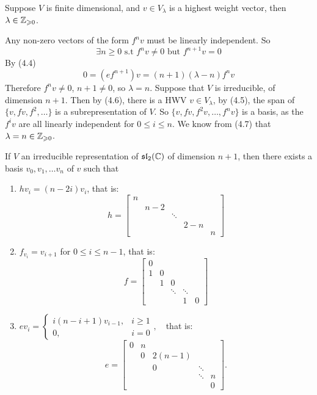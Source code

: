 \documentclass{article}
\begin{document}
\begin{fancylem}{} Suppose $V$ is finite dimensional, and $v \in V_{\lambda}$ is a highest weight vector, then $\lambda \in \mathbb{Z}_{\geqslant0}$.
\end{fancylem}
\proof Any non-zero vectors of the form $f^{n}v$ must be linearly independent. So \[ \exists n\geq 0 \text{  s.t  } f^{n}v \neq 0 \text{  but  } f^{n+1}v=0\]
By ($4.4$) \[ 0 = (ef^{n+1})v = (n+1)(\lambda - n)f^{n}v \]
Therefore $f^{n}v \neq 0$, $n+1 \neq0$, so $\lambda=n$. \endproof Suppose that $V$ is irreducible, of dimension $n+1$. Then by (4.6), there is a HWV $v \in V_{\lambda}$, by (4.5), the span of $\{ v,fv,f^{2},\dots\}$ is a subrepresentation of $V$. So $\{v,fv,f^{2}v, \dots, f^{n}v\}$ is a basis, as the $f^{i}v$ are all linearly independent for $0 \leq i \leq n$. We know from (4.7) that $\lambda = n \in \mathbb{Z}_{\geqslant 0}$.
\begin{corr}{} If $V$ an irreducible representation of $\mathfrak{sl}_{2}(\mathbb{C})$ of dimension $n+1$, then there exists a basis $v_{0},v_{1},\dots v_{n}$ of $v$ such that
\begin{enumerate}
    \item[(i)] $hv_{i} = (n-2i)v_{i}$, that is: \[
        h =
        \begin{bmatrix}
          n & & & &\\
          & n-2 & & &\\
          & & \ddots & &\\
          & & & 2-n &\\
          & & & & n
        \end{bmatrix}
      \]
    \item[(ii)] $f_{v_{i}}=v_{i+1}$ for $0\leq i \leq n-1$, that is:\[
        f =
        \begin{bmatrix}
          0 & & & &\\
          1 & 0 & & &\\
          & 1 & 0 & &\\
          & & \ddots & \ddots  &\\
          & & & 1 & 0
        \end{bmatrix}
      \]
    \item[(iii)] $ev_{i} = \begin{cases}
        i(n-i+1)v_{i-1}, & i\geq 1\\
        0, & i=0 
    \end{cases}, \, \, \, \,$
    that is: \[
        e =
        \begin{bmatrix}
          0 & n & & &\\
            & 0 & 2(n-1) & &\\
            & & 0 & \ddots &\\
          & & & \ddots & n \\
          & & & & 0
        \end{bmatrix}.
      \]
\end{enumerate}
\end{corr}
\end{document}
